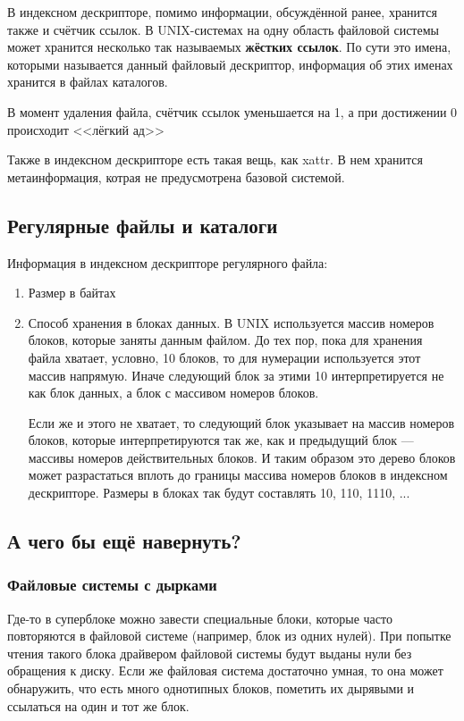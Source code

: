 В индексном дескрипторе, помимо информации, обсуждённой ранее, хранится также и счётчик ссылок. В UNIX-системах на одну область файловой системы может хранится несколько так называемых \textbf{жёстких ссылок}. По сути это имена, которыми называется данный файловый дескриптор, информация об этих именах хранится в файлах каталогов.

В момент удаления файла, счётчик ссылок уменьшается на 1, а при достижении 0 происходит <<лёгкий ад>>

Также в индексном дескрипторе есть такая вещь, как xattr. В нем хранится метаинформация, котрая не предусмотрена базовой системой.

\subsection{Регулярные файлы и каталоги}
Информация в индексном дескрипторе регулярного файла:
\begin{enumerate}
\item Размер в байтах
\item Способ хранения в блоках данных. В UNIX используется массив номеров блоков, которые заняты данным файлом. До тех пор, пока для хранения файла хватает, условно, 10 блоков, то для нумерации используется этот массив напрямую. Иначе следующий блок за этими 10 интерпретируется не как блок данных, а блок с массивом номеров блоков.

Если же и этого не хватает, то следующий блок указывает на массив номеров блоков, которые интерпретируются так же, как и предыдущий блок --- массивы номеров действительных блоков. И таким образом это дерево блоков может разрастаться вплоть до границы массива номеров блоков в индексном дескрипторе. Размеры в блоках так будут составлять  10, 110, 1110, ...
\end{enumerate}

\subsection{А чего бы ещё навернуть?}

\subsubsection{Файловые системы с дырками}

Где-то в суперблоке можно завести специальные блоки, которые часто повторяются в файловой системе (например, блок из одних нулей). При попытке чтения такого блока драйвером файловой системы будут выданы нули без обращения к диску. Если же файловая система достаточно умная, то она может обнаружить, что есть много однотипных блоков, пометить их дырявыми и ссылаться на один и тот же блок.

